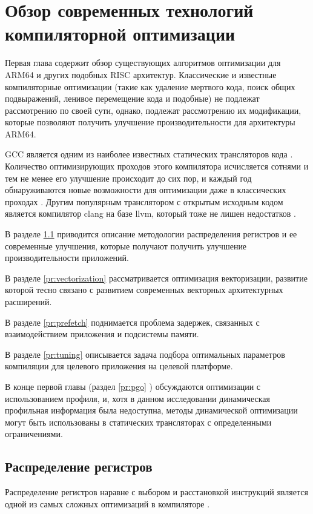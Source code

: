 \chapter{Обзор современных технологий компиляторной оптимизации}\label{ch:chReview}
Первая глава содержит обзор существующих алгоритмов оптимизации для ARM64 и других  подобных  RISC архитектур. Классические и известные компиляторные оптимизации (такие как удаление мертвого кода, поиск общих подвыражений, ленивое перемещение кода и подобные) не подлежат рассмотрению по своей сути, однако, подлежат рассмотрению их модификации, которые позволяют получить улучшение производительности для архитектуры ARM64. 

GCC является одним из наиболее известных статических трансляторов кода \cite{gough2004introduction}. Количество оптимизирующих проходов этого компилятора исчисляется сотнями и тем не менее его улучшение происходит до сих пор, и каждый год обнаруживаются новые возможности для оптимизации даже в классических проходах \cite{theodoridis2022finding}. Другим популярным транслятором с открытым исходным кодом является  компилятор clang на базе llvm, который тоже не лишен недостатков \cite{zhou2021empirical}.

В разделе \ref{pr:regalloc} приводится описание методологии распределения регистров и ее современные улучшения, которые получают получить улучшение производительности приложений.

В разделе \ref{pr:vectorization} рассматривается оптимизация векторизации, развитие которой тесно связано с развитием современных векторных архитектурных расширений.

В разделе \ref{pr:prefetch} поднимается проблема задержек, связанных с  взаимодействием приложения и подсистемы памяти.

В разделе \ref{pr:tuning} описывается задача подбора оптимальных параметров компиляции для целевого приложения на целевой платформе.

В конце первой главы (раздел \ref{pr:pgo} ) обсуждаются оптимизации с использованием профиля, и, хотя в данном исследовании динамическая профильная информация была недоступна, методы динамической оптимизации могут быть использованы в статических трансляторах с определенными ограничениями.

\section{Распределение регистров} \label{pr:regalloc}
Распределение регистров наравне с выбором и расстановкой инструкций является одной из самых сложных оптимизаций в компиляторе \cite{lozano2019survey, alfred2007compilers}. 

